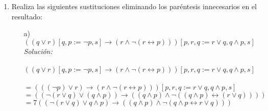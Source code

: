 \documentclass[letterpaper,10pt]{article}
\begin{document}
\begin{enumerate}
\begin{itemize}
            \item[b)] $\{ \} \vdash p \lor (q \land r) 
            \rightarrow (p \land r) \lor q$
            \begin{proof}
                Utilizando una estrategia de derivación que está en las notas
                de clase, basta derivar 
                $\{p\lor (q \land r) \} \vdash (p \land r) \lor q$. Así, 
                \begin{align*}
                    p \lor (q \land r) 
                    && \text{Premisa (1)} \\
                    q \lor (p \land r) 
                    && \text{Conmuta. y asocia. en 1, (2)} \\
                    (p \land r) \lor q
                    && \text{Conmutatividad en 2, (3)}
                \end{align*}
                Por lo tanto, podemos concluir que es válido
                $\{p\lor (q \land r) \} \vdash (p \land r) \lor q$
            \end{proof}
        
        \end{itemize}

        \newpage
        \item Realiza las siguientes sustituciones eliminando los paréntesis
        innecesarios en el resultado:
        \begin{itemize}
            
            \item[a)] $((q \lor r) [q, p := \neg p, s] 
            \rightarrow (r \land \neg (r \leftrightarrow p)))
            [p, r, q := r \lor q, q \land p, s]$ \\
            \textit{Solución: \\ \\}
            $((q \lor r) [q, p := \neg p, s] \rightarrow (r \land \neg (r \leftrightarrow p)))
            [p, r, q := r \lor q, q \land p, s] $ \\ \\
            $= (((\neg p) \lor r) \rightarrow (r \land \neg (r \leftrightarrow p)))
            [p, r, q := r \lor q, q \land p, s] $ \\
            $= ((\neg (r \lor q) \lor (q \land p)) \rightarrow 
            ((q \land p) \land \neg ((q \land p) \leftrightarrow (r \lor q))))$ \\
            $= 7((\neg (r \lor q) \lor q \land p) \rightarrow
            ((q \land p) \land \neg (q \land p \leftrightarrow r \lor q)))$  
            

\end{itemize}
\end{enumerate}
\end{document}
